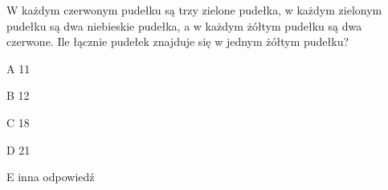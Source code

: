 \begin{tresc}
W każdym czerwonym pudełku są trzy zielone pudełka, w każdym zielonym pudełku są dwa niebieskie pudełka, a w każdym żółtym pudełku są dwa czerwone. Ile łącznie pudełek znajduje się w jednym żółtym pudełku?
\end{tresc}
\begin{wariant}{A} 11 \end{wariant}
\begin{wariant}{B} 12 \end{wariant}
\begin{wariant}{C} 18 \end{wariant}
\begin{wariant}{D} 21 \end{wariant}
\begin{wariant}{E} inna odpowiedź \end{wariant}
